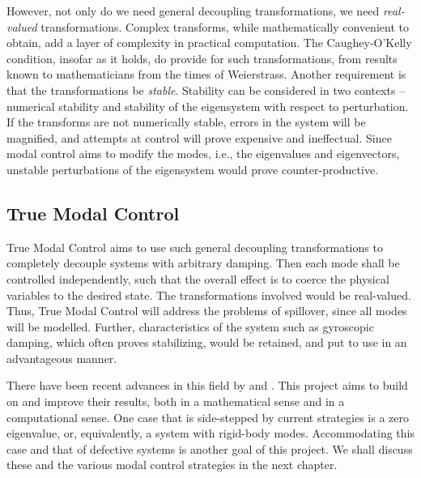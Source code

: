 However, not only do we need general decoupling transformations, we need \emph{real-valued}
transformations. Complex transforms, while mathematically convenient to obtain,
add a layer of complexity in practical computation. The Caughey-O'Kelly condition,
insofar as it holds, do provide for such transformations, from results known to
mathematicians from the times of Weierstrass. Another requirement is that the
transformations be \emph{stable}. Stability can be considered in two contexts -- 
numerical stability and stability of the eigensystem with respect to perturbation.
If the transforms are not numerically stable, errors in the system will be
magnified, and attempts at control will prove expensive and ineffectual. Since
modal control aims to modify the modes, i.e., the eigenvalues and eigenvectors,
unstable perturbations of the eigensystem would prove counter-productive.

\subsection{True Modal Control}
True Modal Control aims to use such general decoupling transformations to completely
decouple systems with arbitrary damping. Then each mode shall be controlled 
independently, such that the overall effect is to coerce the physical variables
to the desired state. The transformations involved would be real-valued. Thus,
True Modal Control will address the problems of spillover, since all modes will
be modelled. Further, characteristics of the system such as gyroscopic damping,
which often proves stabilizing, would be retained, and put to use in an
advantageous manner.

There have been recent advances in this field by \citet{GARVEY2002885,GARVEY2002911}
and \citet{Chu200896,Chu2008112}. This project aims to build on and improve 
their results, both in a mathematical sense and in a computational sense. One case
that is side-stepped by current strategies is a zero eigenvalue, or, equivalently,
a system with rigid-body modes. Accommodating this case and that of defective systems
is another goal of this project. We shall discuss these and the various modal 
control strategies in the next chapter. %

